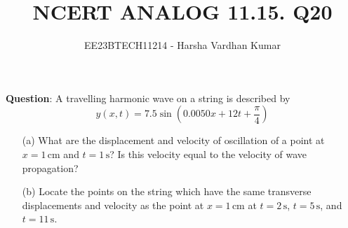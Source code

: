 \documentclass[journal,12pt,twocolumn]{IEEEtran}
\title{NCERT ANALOG 11.15. Q20}
\author{EE23BTECH11214 - Harsha Vardhan Kumar}
\begin{document}
\maketitle
\textbf{Question}:
A travelling harmonic wave on a string is described by
$$ y(x,t) = 7.5 \sin(0.0050x + 12t + \frac{\pi}{4}) $$
\begin{enumerate}
    \item[(a)] What are the displacement and velocity of oscillation of a point at $x = 1\,\text{cm}$ and $t = 1\,\text{s}$? Is this velocity equal to the velocity of wave propagation?
    
    \item[(b)] Locate the points on the string which have the same transverse displacements and velocity as the point at $x = 1\,\text{cm}$ at $t = 2\,\text{s}$, $t = 5\,\text{s}$, and $t = 11\,\text{s}$.
\end{enumerate}
\end{document}
